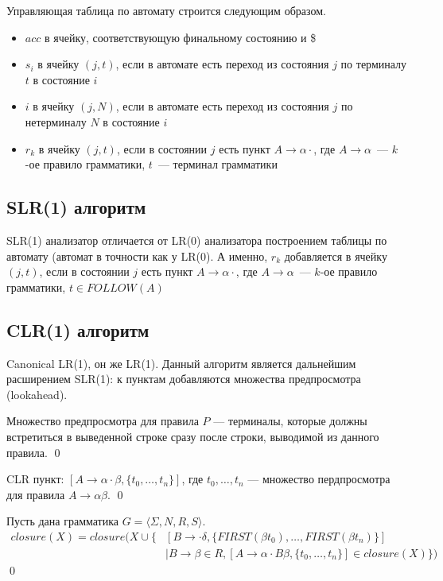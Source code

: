 Управляющая таблица по автомату строится следующим образом.

\begin{itemize}
    \item $acc$ в ячейку, соответствующую финальному состоянию и \$ 
    \item $s_i$ в ячейку $(j,t)$, если в автомате есть переход из состояния $j$ по терминалу $t$ в состояние $i$
    \item $i$ в ячейку $(j, N)$, если в автомате есть переход из состояния $j$ по нетерминалу $N$ в состояние $i$
    \item $r_k$ в ячейку $(j,t)$, если в состоянии $j$ есть пункт $A \to \alpha \cdot$, где $A \to \alpha$~--- $k$-ое правило грамматики, $t$~--- терминал грамматики
  \end{itemize}

\subsection{SLR(1) алгоритм}

SLR(1) анализатор отличается от LR(0) анализатора построением таблицы по автомату (автомат в точности как у LR(0).
А именно, $r_k$ добавляется в ячейку $(j,t)$, если в состоянии $j$ есть пункт $A \to \alpha \cdot$, где $A \to \alpha$~--- $k$-ое правило грамматики, $t \in FOLLOW(A)$

\subsection{CLR(1) алгоритм}

Canonical LR(1), он же LR(1).
Данный алгоритм является дальнейшим расширением SLR(1): к пунктам добавляются множества предпросмотра (lookahead).

\begin{definition}
Множество предпросмотра для правила $P$ --- терминалы, которые должны встретиться в выведенной строке сразу после строки, выводимой из данного правила.  
\qed
\end{definition}

\begin{definition}
CLR пункт: $ [A \to \alpha \cdot \beta, \{ t_0, \dots, t_n\}] $,
где $t_0, \dots, t_n$ --- множество пердпросмотра для правила $A \to \alpha \beta$.
\qed
\end{definition}


\begin{definition}
Пусть дана грамматика $G = \langle \Sigma, N, R, S\rangle$. 
\begin{align*}
 closure(X) = closure(X \cup \{&[B \to \cdot \delta, \{FIRST(\beta t_0), \dots, FIRST(\beta t_n)\}] \\
                               &\mid B \to \beta \in R, [A \to \alpha \cdot B \beta, \{t_0, \dots, t_n\}] \in closure(X)\})
\end{align*}
\qed
\end{definition}

